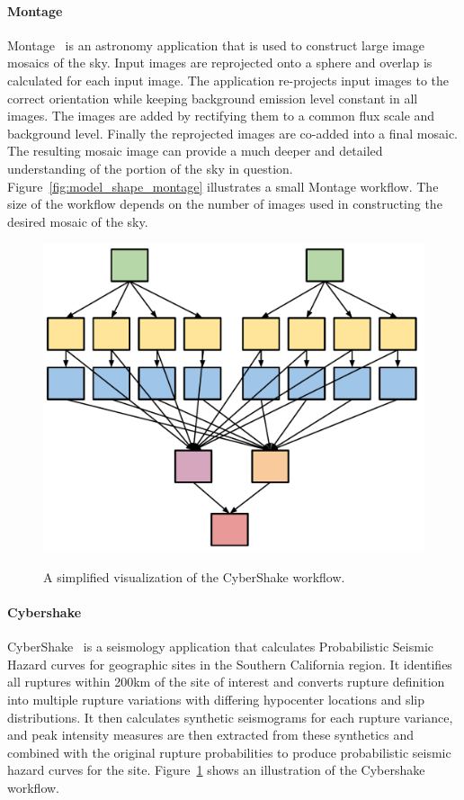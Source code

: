 \paragraph{\textbf{Montage}}
Montage~\cite{Berriman2004} is an astronomy application that is used to construct large image mosaics of the sky. Input images are reprojected onto a sphere and overlap is calculated for each input image. The application re-projects input images to the correct orientation while keeping background emission level constant in all images. The images are added by rectifying them to a common flux scale and background level. Finally the reprojected images are co-added into a final mosaic. The resulting mosaic image can provide a much deeper and detailed understanding of the portion of the sky in question. Figure~\ref{fig:model_shape_montage} illustrates a small Montage workflow. The size of the workflow depends on the number of images used in constructing the desired mosaic of the sky. 

\begin{figure}[htb]
	\centering
	\includegraphics[width=0.5\linewidth]{figures/workflowsim/cybershake_shape.pdf} \\
	\caption{A simplified visualization of the CyberShake workflow.}
	\label{fig:model_shape_cybershake}
\end{figure}

\paragraph{\textbf{Cybershake}}
CyberShake~\cite{Graves2010} is a seismology application that calculates Probabilistic Seismic Hazard curves for geographic sites in the Southern California region. It identifies all ruptures within 200km of the site of interest and converts rupture definition into multiple rupture variations with differing hypocenter locations and slip distributions. It then calculates synthetic seismograms for each rupture variance, and peak intensity measures are then extracted from these synthetics and combined with the original rupture probabilities to produce probabilistic seismic hazard curves for the site. Figure~\ref{fig:model_shape_cybershake} shows an illustration of the Cybershake workflow.

